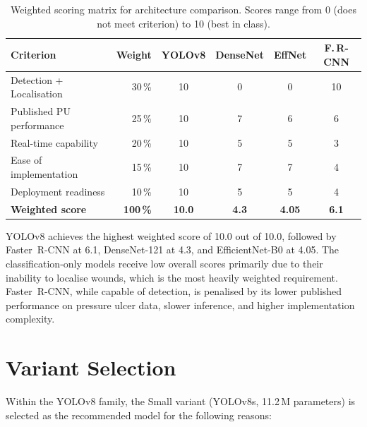 \documentclass[a4paper,12pt,twoside]{report}
\begin{document}
\begin{table}[htbp]
  \centering
  \caption{Weighted scoring matrix for architecture comparison. Scores range from
    0 (does not meet criterion) to 10 (best in class).}
  \label{tab:scoring}
  \small
  \begin{tabularx}{\textwidth}{Xrcccc}
    \toprule
    \textbf{Criterion} & \textbf{Weight} & \textbf{YOLOv8} &
      \textbf{DenseNet} & \textbf{EffNet} & \textbf{F.\,R-CNN} \\
    \midrule
    Detection + Localisation & 30\,\% & 10 & 0 & 0 & 10 \\
    Published PU performance & 25\,\% & 10 & 7 & 6 & 6 \\
    Real-time capability     & 20\,\% & 10 & 5 & 5 & 3 \\
    Ease of implementation   & 15\,\% & 10 & 7 & 7 & 4 \\
    Deployment readiness     & 10\,\% & 10 & 5 & 5 & 4 \\
    \midrule
    \textbf{Weighted score}  & \textbf{100\,\%} & \textbf{10.0} & \textbf{4.3}
      & \textbf{4.05} & \textbf{6.1} \\
    \bottomrule
  \end{tabularx}
\end{table}

YOLOv8 achieves the highest weighted score of 10.0 out of 10.0, followed by
Faster~R-CNN at 6.1, DenseNet-121 at 4.3, and EfficientNet-B0 at 4.05. The
classification-only models receive low overall scores primarily due to their
inability to localise wounds, which is the most heavily weighted requirement.
Faster~R-CNN, while capable of detection, is penalised by its lower published
performance on pressure ulcer data, slower inference, and higher implementation
complexity.

\section{Variant Selection}
\label{sec:variant-selection}

Within the YOLOv8 family, the Small variant (YOLOv8s, 11.2\,M parameters) is
selected as the recommended model for the following reasons:
\end{document}
